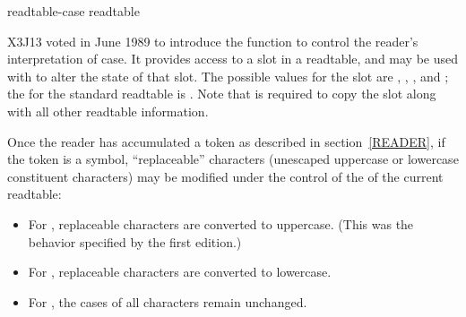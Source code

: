 \begin{newer}
\begin{defun}[Function]
readtable-case readtable

X3J13 voted in June 1989 
to introduce the function  to
control the reader's interpretation of case.
It provides access to a slot in a readtable, and may be used with 
to alter the state of that slot.
The possible values for the slot are , ,
, and ; the  for the standard readtable
is .
Note that  is required to copy the  slot
along with all other readtable information.

Once the reader has accumulated a token as described in section~\ref{READER},
if the token is a symbol, ``replaceable'' characters (unescaped uppercase or
lowercase constituent characters)
may be modified under the control of the  of the current readtable:
\begin{itemize}
\item For , replaceable characters are converted to uppercase.
(This was the behavior specified by the first edition.)

\item For , replaceable characters are converted to lowercase.

\item For , the cases of all characters remain unchanged.


\end{itemize}
\end{defun}
\end{newer}

